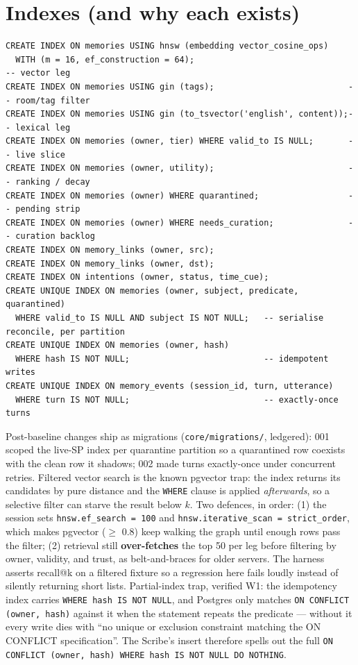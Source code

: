 \section{Indexes (and why each exists)}
\begin{Verbatim}[breaklines=true,fontsize=\small]
CREATE INDEX ON memories USING hnsw (embedding vector_cosine_ops)
  WITH (m = 16, ef_construction = 64);                                -- vector leg
CREATE INDEX ON memories USING gin (tags);                           -- room/tag filter
CREATE INDEX ON memories USING gin (to_tsvector('english', content));-- lexical leg
CREATE INDEX ON memories (owner, tier) WHERE valid_to IS NULL;       -- live slice
CREATE INDEX ON memories (owner, utility);                           -- ranking / decay
CREATE INDEX ON memories (owner) WHERE quarantined;                  -- pending strip
CREATE INDEX ON memories (owner) WHERE needs_curation;               -- curation backlog
CREATE INDEX ON memory_links (owner, src);
CREATE INDEX ON memory_links (owner, dst);
CREATE INDEX ON intentions (owner, status, time_cue);
CREATE UNIQUE INDEX ON memories (owner, subject, predicate, quarantined)
  WHERE valid_to IS NULL AND subject IS NOT NULL;   -- serialise reconcile, per partition
CREATE UNIQUE INDEX ON memories (owner, hash)
  WHERE hash IS NOT NULL;                           -- idempotent writes
CREATE UNIQUE INDEX ON memory_events (session_id, turn, utterance)
  WHERE turn IS NOT NULL;                           -- exactly-once turns
\end{Verbatim}
Post-baseline changes ship as migrations (\texttt{core/migrations/}, ledgered): 001 scoped the
live-SP index per quarantine partition so a quarantined row coexists with the clean row it
shadows; 002 made turns exactly-once under concurrent retries.
Filtered vector search is the known pgvector trap: the index returns its candidates by pure
distance and the \texttt{WHERE} clause is applied \emph{afterwards}, so a selective filter can
starve the result below $k$. Two defences, in order: (1) the session sets
\texttt{hnsw.ef\_search = 100} and \texttt{hnsw.iterative\_scan = strict\_order}, which makes
pgvector ($\geq$ 0.8) keep walking the graph until enough rows pass the filter; (2) retrieval
still \textbf{over-fetches} the top 50 per leg before filtering by owner, validity, and trust,
as belt-and-braces for older servers. The harness asserts recall@k on a filtered fixture so a
regression here fails loudly instead of silently returning short lists. Partial-index trap,
verified W1: the idempotency index carries \texttt{WHERE hash IS NOT NULL}, and Postgres only
matches \texttt{ON CONFLICT (owner, hash)} against it when the statement repeats the predicate
--- without it every write dies with ``no unique or exclusion constraint matching the ON
CONFLICT specification''. The Scribe's insert therefore spells out the full
\texttt{ON CONFLICT (owner, hash) WHERE hash IS NOT NULL DO NOTHING}.

